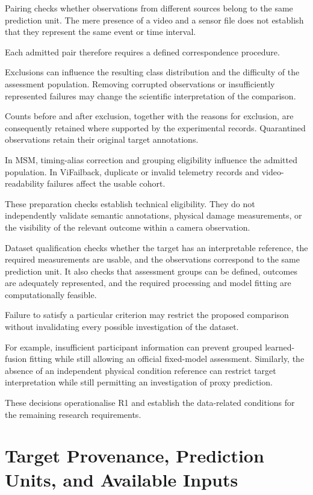 Pairing checks whether observations from different sources belong to the same prediction unit. The mere presence of a video and a sensor file does not establish that they represent the same event or time interval.

Each admitted pair therefore requires a defined correspondence procedure.

Exclusions can influence the resulting class distribution and the difficulty of the assessment population. Removing corrupted observations or insufficiently represented failures may change the scientific interpretation of the comparison.

Counts before and after exclusion, together with the reasons for exclusion, are consequently retained where supported by the experimental records. Quarantined observations retain their original target annotations.

In MSM, timing-alias correction and grouping eligibility influence the admitted population. In ViFailback, duplicate or invalid telemetry records and video-readability failures affect the usable cohort.

These preparation checks establish technical eligibility. They do not independently validate semantic annotations, physical damage measurements, or the visibility of the relevant outcome within a camera observation.

Dataset qualification checks whether the target has an interpretable reference, the required measurements are usable, and the observations correspond to the same prediction unit. It also checks that assessment groups can be defined, outcomes are adequately represented, and the required processing and model fitting are computationally feasible.

Failure to satisfy a particular criterion may restrict the proposed comparison without invalidating every possible investigation of the dataset.

For example, insufficient participant information can prevent grouped learned-fusion fitting while still allowing an official fixed-model assessment. Similarly, the absence of an independent physical condition reference can restrict target interpretation while still permitting an investigation of proxy prediction.

These decisions operationalise R1 and establish the data-related conditions for the remaining research requirements.

\section{Target Provenance, Prediction Units, and Available Inputs}
\label{sec:ch4-targets}

